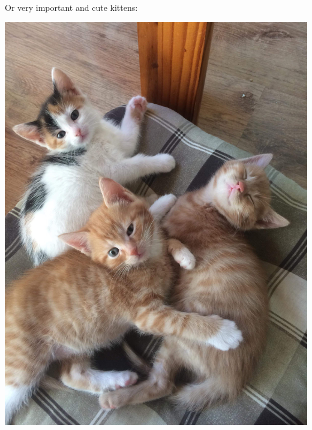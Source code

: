 \documentclass[a0paper,fleqn,landscape]{betterposter}
\begin{document}
{Or very important and cute kittens:
\begin{center}
\includegraphics[width=\textwidth]{img/kittens}
\end{center}







}
\end{document}
